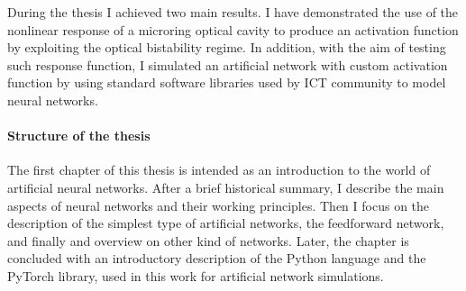 During the thesis I achieved two main results.
I have demonstrated the use of the nonlinear response of a microring optical cavity to produce an activation function by exploiting the optical bistability regime.
In addition, with the aim of testing such response function, I simulated an artificial network with custom activation function by using standard software libraries used by \ac{ICT} community to model neural networks.


\paragraph{Structure of the thesis\\}

The first chapter of this thesis is intended as an introduction to the world of artificial neural networks.
After a brief historical summary, I describe the main aspects of neural networks and their working principles.
Then I focus on the description of the simplest type of artificial networks, the feedforward network, and finally and overview on other kind of networks.
Later, the chapter is concluded with an introductory description of the Python language and the PyTorch library, used in this work for artificial network simulations.

